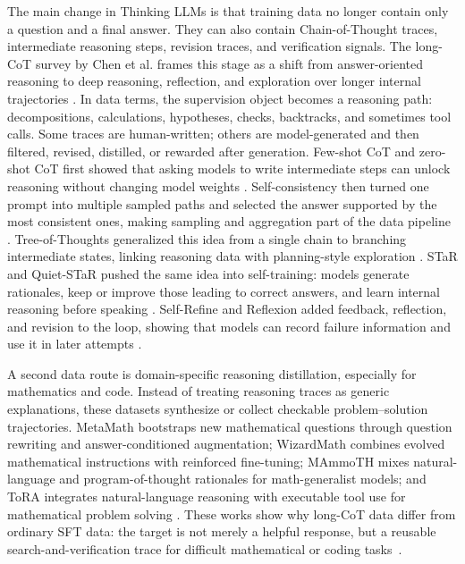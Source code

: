 The main change in Thinking LLMs is that training data no longer contain only a question and a final answer. They can also contain Chain-of-Thought traces, intermediate reasoning steps, revision traces, and verification signals. The long-CoT survey by Chen et al. frames this stage as a shift from answer-oriented reasoning to deep reasoning, reflection, and exploration over longer internal trajectories \citep{chen2025towards}. In data terms, the supervision object becomes a reasoning path: decompositions, calculations, hypotheses, checks, backtracks, and sometimes tool calls. Some traces are human-written; others are model-generated and then filtered, revised, distilled, or rewarded after generation. Few-shot CoT and zero-shot CoT first showed that asking models to write intermediate steps can unlock reasoning without changing model weights \citep{wei2022chain,kojima2022large}. Self-consistency then turned one prompt into multiple sampled paths and selected the answer supported by the most consistent ones, making sampling and aggregation part of the data pipeline \citep{wang2022self}. Tree-of-Thoughts generalized this idea from a single chain to branching intermediate states, linking reasoning data with planning-style exploration \citep{yao2023tree}. STaR and Quiet-STaR pushed the same idea into self-training: models generate rationales, keep or improve those leading to correct answers, and learn internal reasoning before speaking \citep{zelikman2022star,zelikman2024quiet}. Self-Refine and Reflexion added feedback, reflection, and revision to the loop, showing that models can record failure information and use it in later attempts \citep{madaan2023selfrefine,shinn2023reflexion,chen2025survey,wang2026aligning,zhu2025multiagentbench,chen2026agent,yin2024safeagentbench}.

A second data route is domain-specific reasoning distillation, especially for mathematics and code. Instead of treating reasoning traces as generic explanations, these datasets synthesize or collect checkable problem--solution trajectories. MetaMath bootstraps new mathematical questions through question rewriting and answer-conditioned augmentation; WizardMath combines evolved mathematical instructions with reinforced fine-tuning; MAmmoTH mixes natural-language and program-of-thought rationales for math-generalist models; and ToRA integrates natural-language reasoning with executable tool use for mathematical problem solving \citep{yu2024metamath,luo2023wizardmath,yue2023mammoth,gou2023tora}. These works show why long-CoT data differ from ordinary SFT data: the target is not merely a helpful response, but a reusable search-and-verification trace for difficult mathematical or coding tasks~\citep{wang2026surveytrajectory,tang2026dsgbench,zhang2025agentorchestra,soni2026coding,fourney2024magentic}.

